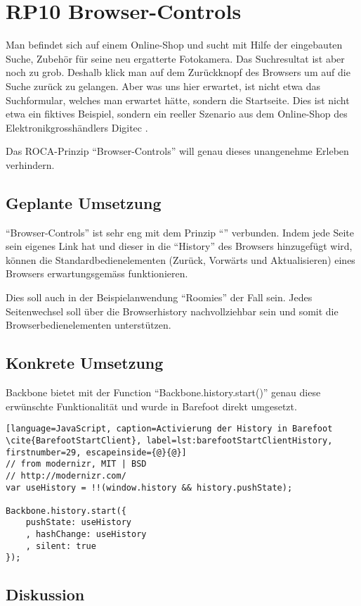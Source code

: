 \section{RP10 Browser-Controls}
\label{sec:principle-rp10-browser-controls}
Man befindet sich auf einem Online-Shop und sucht mit Hilfe der eingebauten Suche, Zubehör für seine neu ergatterte Fotokamera. Das Suchresultat ist aber noch zu grob. Deshalb klick man auf dem Zurückknopf des Browsers um auf die Suche zurück zu gelangen. Aber was uns hier erwartet, ist nicht etwa das Suchformular, welches man erwartet hätte, sondern die Startseite.
Dies ist nicht etwa ein fiktives Beispiel, sondern ein reeller Szenario aus dem Online-Shop des Elektronikgrosshändlers Digitec \cite{Digitec}.

Das ROCA-Prinzip ``Browser-Controls'' will genau dieses unangenehme Erleben verhindern.

\subsection*{Geplante Umsetzung}

``Browser-Controls'' ist sehr eng mit dem Prinzip ``'' verbunden. Indem jede Seite sein eigenes Link hat und dieser in die ``History'' des Browsers hinzugefügt wird, können die Standardbedienelementen (Zurück, Vorwärts und Aktualisieren) eines Browsers erwartungsgemäss funktionieren.

Dies soll auch in der Beispielanwendung ``Roomies'' der Fall sein. Jedes Seitenwechsel soll über die Browserhistory nachvollziehbar sein und somit die Browserbedienelementen unterstützen.

\subsection*{Konkrete Umsetzung}

Backbone bietet mit der Function ``Backbone.history.start()'' \cite{BackbonejsHistory} genau diese erwünschte Funktionalität und wurde in Barefoot direkt umgesetzt.

\begin{lstlisting}[language=JavaScript, caption=Activierung der History in Barefoot \cite{BarefootStartClient}, label=lst:barefootStartClientHistory, firstnumber=29, escapeinside={@}{@}]
// from modernizr, MIT | BSD
// http://modernizr.com/
var useHistory = !!(window.history && history.pushState);

Backbone.history.start({
	pushState: useHistory
	, hashChange: useHistory
	, silent: true
});
\end{lstlisting}

\subsection*{Diskussion}
